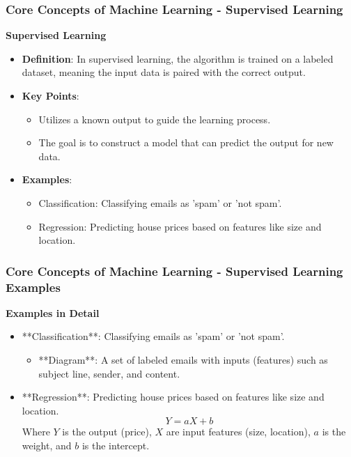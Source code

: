 \documentclass{beamer}
\begin{document}
\begin{frame}[fragile]
    \frametitle{Core Concepts of Machine Learning - Supervised Learning}
    \textbf{Supervised Learning}
    \begin{itemize}
        \item \textbf{Definition}: In supervised learning, the algorithm is trained on a labeled dataset, meaning the input data is paired with the correct output.
        \item \textbf{Key Points}:
        \begin{itemize}
            \item Utilizes a known output to guide the learning process.
            \item The goal is to construct a model that can predict the output for new data.
        \end{itemize}
        \item \textbf{Examples}:
        \begin{itemize}
            \item Classification: Classifying emails as 'spam' or 'not spam'.
            \item Regression: Predicting house prices based on features like size and location.
        \end{itemize}
    \end{itemize}
\end{frame}

\begin{frame}[fragile]
    \frametitle{Core Concepts of Machine Learning - Supervised Learning Examples}
    \textbf{Examples in Detail}
    \begin{itemize}
        \item **Classification**: Classifying emails as 'spam' or 'not spam'.
        \begin{itemize}
            \item **Diagram**: A set of labeled emails with inputs (features) such as subject line, sender, and content.
        \end{itemize}
        \item **Regression**: Predicting house prices based on features like size and location.
        \begin{equation}
        Y = aX + b
        \end{equation}
        Where \(Y\) is the output (price), \(X\) are input features (size, location), \(a\) is the weight, and \(b\) is the intercept.
    \end{itemize}
\end{frame}
\end{document}
